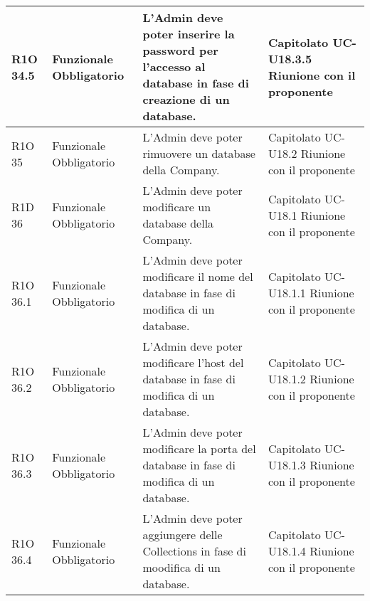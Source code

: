 \begin{center}
\begin{longtable}{ | l | p{2cm} | p{4.7cm} | p{2.5cm} |}
    R1O 34.5 & Funzionale \newline Obbligatorio & L'Admin deve poter inserire la password per l'accesso al database in fase di creazione di un database. & Capitolato \newline UC-U18.3.5 \newline Riunione con il proponente \\ \hline
    
    R1O 35 & Funzionale \newline Obbligatorio & L'Admin deve poter rimuovere un database della Company. & Capitolato \newline UC-U18.2 \newline Riunione con il proponente \\ \hline
    
    R1D 36 & Funzionale \newline Obbligatorio & L'Admin deve poter modificare un database della Company. & Capitolato \newline UC-U18.1 \newline Riunione con il proponente \\ \hline
        
    R1O 36.1 & Funzionale \newline Obbligatorio & L'Admin deve poter modificare il nome del database in fase di modifica di un database. & Capitolato \newline UC-U18.1.1 \newline Riunione con il proponente \\ \hline
	      	
   	R1O 36.2 & Funzionale \newline Obbligatorio & L'Admin deve poter modificare l'host del database in fase di modifica di un database. & Capitolato \newline UC-U18.1.2 \newline Riunione con il proponente \\ \hline
   	
   	R1O 36.3 & Funzionale \newline Obbligatorio & L'Admin deve poter modificare la porta del database in fase di modifica di un database. & Capitolato \newline UC-U18.1.3 \newline Riunione con il proponente \\ \hline
	    	
	R1O 36.4 & Funzionale \newline Obbligatorio & L'Admin deve poter aggiungere delle Collections in fase di moodifica di un database. & Capitolato \newline UC-U18.1.4 \newline Riunione con il proponente \\ \hline
	

\end{longtable}
\end{center}
